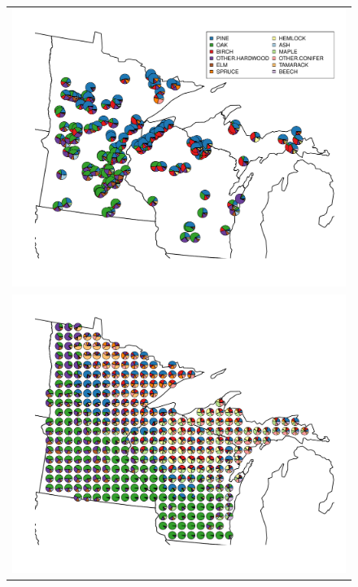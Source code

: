 

\begin{figure}
\centering
\begin{tabular}{c}
\includegraphics[width=5in]{figures/pie_plot_pollen_UMW_v01.pdf} \\
\includegraphics[width=5in]{figures/pie_plot_pls_UMW_v01.pdf}
\end{tabular}
\caption{}
\label{fig:pie}
\end{figure}

